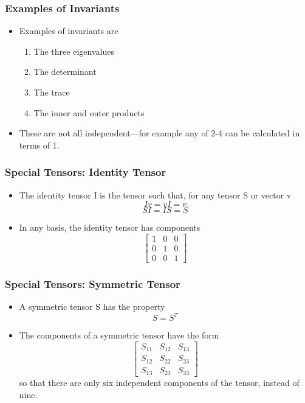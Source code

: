 \documentclass{beamer}
\begin{document}
\begin{frame}
\frametitle{Examples of Invariants}
\begin{itemize}
    \item Examples of invariants are
    \begin{enumerate}
        \item The three eigenvalues
        \item The determinant
        \item The trace
        \item The inner and outer products
    \end{enumerate}
    \item These are not all independent—for example any of 2-4 can be calculated in terms of 1.
\end{itemize}
\end{frame}

\begin{frame}
\frametitle{Special Tensors: Identity Tensor}
\begin{itemize}
    \item The identity tensor I is the tensor such that, for any tensor S or vector v
    \[
    I v = v I = v
    \]
    \[
    S I = I S = S
    \]
    \item In any basis, the identity tensor has components
    \[
    \begin{bmatrix}
        1 & 0 & 0 \\
        0 & 1 & 0 \\
        0 & 0 & 1
    \end{bmatrix}
    \]
\end{itemize}
\end{frame}

\begin{frame}
\frametitle{Special Tensors: Symmetric Tensor}
\begin{itemize}
    \item A symmetric tensor S has the property
    \[
    S = S^T
    \]
    \item The components of a symmetric tensor have the form
    \[
    \begin{bmatrix}
        S_{11} & S_{12} & S_{13} \\
        S_{12} & S_{22} & S_{23} \\
        S_{13} & S_{23} & S_{33}
    \end{bmatrix}
    \]
    so that there are only six independent components of the tensor, instead of nine.
\end{itemize}
\end{frame}
\end{document}
